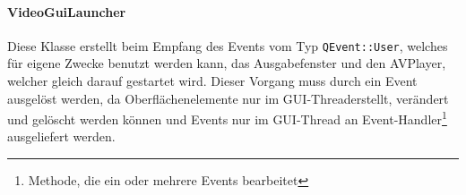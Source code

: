 \documentclass{article}
\begin{document}
    \paragraph{VideoGuiLauncher}
    Diese Klasse erstellt beim Empfang des Events vom Typ \texttt{QEvent::User}, welches für eigene Zwecke benutzt werden kann, das Ausgabefenster und den AVPlayer,
    welcher gleich darauf gestartet wird.
    Dieser Vorgang muss durch ein Event ausgelöst werden, da Oberflächenelemente nur im GUI-Thread\footnotemark[1] erstellt, verändert und gelöscht werden können und
    Events nur im GUI-Thread an Event-Handler\footnote[2]{Methode, die ein oder mehrere Events bearbeitet} ausgeliefert werden.
\end{document}
